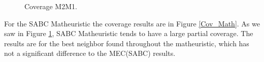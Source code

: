 \begin{figure}[H]
\hspace{0.4cm}%
\vspace{0.4cm}
\caption{Coverage M2M1.}
\label{Cov_M2M1}
\end{figure}

For the SABC Matheuristic the coverage results are in Figure \ref{Cov_Math}. As we saw in Figure \ref{Cov_M2M1}, SABC Matheuristic tends to have a large partial coverage. The results are for the best neighbor found throughout the matheuristic, which has not a significant difference to the MEC(SABC) results.

